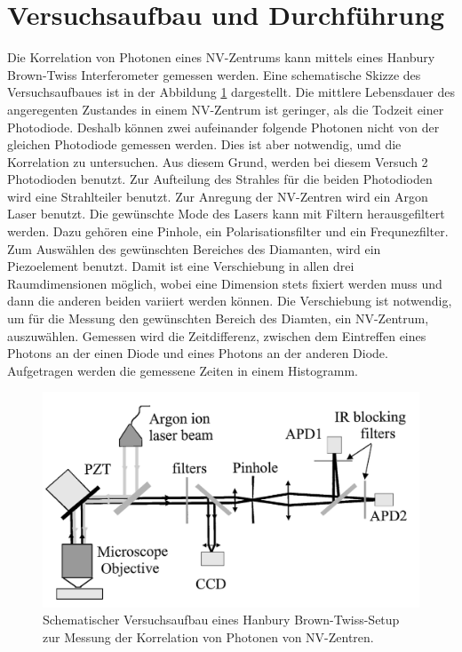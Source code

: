 \section{Versuchsaufbau und Durchf\"uhrung}
Die Korrelation von Photonen eines NV-Zentrums kann mittels eines  Hanbury Brown-Twiss Interferometer
gemessen werden. Eine schematische Skizze des Versuchsaufbaues ist in der Abbildung \ref{fig:Versuchsaufbau} dargestellt. 
Die mittlere Lebensdauer des angeregenten Zustandes in einem NV-Zentrum ist geringer, als die Todzeit einer Photodiode. 
Deshalb k\"onnen zwei aufeinander folgende Photonen nicht von der gleichen Photodiode gemessen werden. 
Dies ist aber notwendig, umd die Korrelation zu untersuchen. Aus diesem Grund, werden bei diesem Versuch 2 Photodioden benutzt. 
Zur Aufteilung des Strahles für die beiden Photodioden wird eine Strahlteiler benutzt. Zur Anregung der NV-Zentren wird ein Argon Laser benutzt. 
Die gewünschte Mode des Lasers kann mit Filtern herausgefiltert werden. Dazu gehören eine Pinhole, ein Polarisationsfilter und ein Frequnezfilter.  
Zum Ausw\"ahlen des gew\"unschten Bereiches des Diamanten, wird ein Piezoelement benutzt. 
Damit ist eine Verschiebung in allen drei Raumdimensionen m\"oglich, wobei eine Dimension stets fixiert werden muss und dann die anderen beiden variiert werden k\"onnen. 
Die Verschiebung ist notwendig, um f\"ur die Messung den gew\"unschten Bereich des Diamten, ein NV-Zentrum, auszuw\"ahlen. Gemessen wird die Zeitdifferenz, zwischen dem Eintreffen eines Photons an der einen Diode und eines Photons an der anderen Diode. 
Aufgetragen werden die gemessene Zeiten in einem Histogramm.   
\begin{figure}[H]
\centering
\includegraphics[scale=0.6]{Versuchsaufbau.PNG}
\caption{Schematischer Versuchsaufbau eines Hanbury Brown-Twiss-Setup zur Messung der Korrelation von Photonen von NV-Zentren.  }
\label{fig:Versuchsaufbau}
\end{figure}

